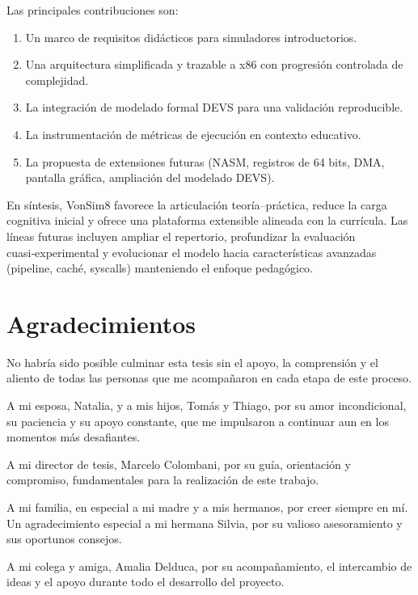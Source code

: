 \documentclass[12pt,oneside]{templates/unerthesis}
\providecommand{\tightlist}{%
  \setlength{\itemsep}{0pt}\setlength{\parskip}{0pt}}
\begin{document}
Las principales contribuciones son:

\begin{enumerate}
\def\labelenumi{\arabic{enumi}.}
\tightlist
\item
  Un marco de requisitos didácticos para simuladores introductorios.
\item
  Una arquitectura simplificada y trazable a x86 con progresión controlada de complejidad.
\item
  La integración de modelado formal DEVS para una validación reproducible.
\item
  La instrumentación de métricas de ejecución en contexto educativo.
\item
  La propuesta de extensiones futuras (NASM, registros de 64 bits, DMA, pantalla gráfica, ampliación del modelado DEVS).
\end{enumerate}

En síntesis, VonSim8 favorece la articulación teoría--práctica, reduce la carga cognitiva inicial y ofrece una plataforma extensible alineada con la currícula. Las líneas futuras incluyen ampliar el repertorio, profundizar la evaluación cuasi‑experimental y evolucionar el modelo hacia características avanzadas (pipeline, caché, syscalls) manteniendo el enfoque pedagógico.

\hypertarget{agradecimientos}{%
\chapter*{Agradecimientos}\label{agradecimientos}}

No habría sido posible culminar esta tesis sin el apoyo, la comprensión y el aliento de todas las personas que me acompañaron en cada etapa de este proceso.

A mi esposa, Natalia, y a mis hijos, Tomás y Thiago, por su amor incondicional, su paciencia y su apoyo constante, que me impulsaron a continuar aun en los momentos más desafiantes.

A mi director de tesis, Marcelo Colombani, por su guía, orientación y compromiso, fundamentales para la realización de este trabajo.

A mi familia, en especial a mi madre y a mis hermanos, por creer siempre en mí. Un agradecimiento especial a mi hermana Silvia, por su valioso asesoramiento y sus oportunos consejos.

A mi colega y amiga, Amalia Delduca, por su acompañamiento, el intercambio de ideas y el apoyo durante todo el desarrollo del proyecto.
\end{document}
